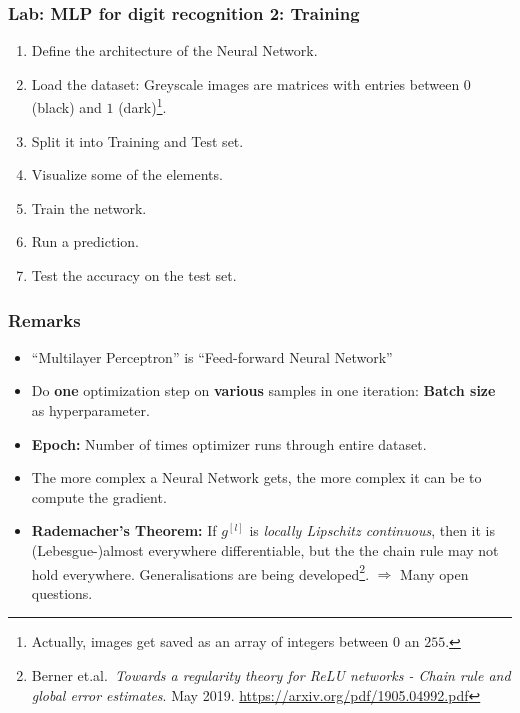 \documentclass[10pt,hyperref={pdfpagelabels=false}]{beamer}
\begin{document}
\begin{frame}
    \frametitle{Lab: MLP for digit recognition 2: Training}
        \begin{enumerate}
            \item Define the architecture of the Neural Network.
            \item Load the dataset: Greyscale images are matrices with entries between $0$ (black) and $1$ (dark)\footnote{Actually, images get saved as an array of integers between $0$ an $255$.}.
            \item Split it into Training and Test set.
            \item Visualize some of the elements.
            \item Train the network.
            \item Run a prediction.
            \item Test the accuracy on the test set.
        \end{enumerate}
\end{frame}
\begin{frame}
    \frametitle{Remarks}
    \begin{itemize}
        \item ``Multilayer Perceptron'' is ``Feed-forward Neural Network''
        \item Do {\bf one} optimization step on {\bf various} samples in one iteration: {\bf Batch size} as hyperparameter.
        \item {\bf Epoch:} Number of times optimizer runs through entire dataset.
        \item The more complex a Neural Network gets, the more complex it can be to compute the gradient.
        \item {\bf Rademacher's Theorem:} If $g^{[l]}$ is \emph{locally Lipschitz continuous}, then it is (Lebesgue-)almost everywhere differentiable, but the the chain rule may not hold everywhere. Generalisations are being developed\footnote{Berner et.al.~\emph{Towards a regularity theory for ReLU networks - Chain rule and global error estimates}. May 2019. \url{https://arxiv.org/pdf/1905.04992.pdf}}.
        \hfill $\Rightarrow$ Many open questions.
    \end{itemize}
\end{frame}
\end{document}
